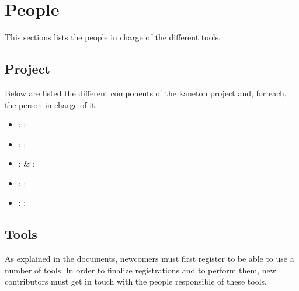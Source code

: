 %
%
%
%
%
%

%
%

\chapter{People}
\label{chapter:people}

This sections lists the people in charge of the different tools.

\newpage

%
%

%
%

\section{Project}

Below are listed the different components of the kaneton project and, for each,
the person in charge of it.

\begin{itemize}
  \item
    : ;
  \item
    : ;
  \item
    :  \& ;
  \item
    : ;
  \item
    : ;
\end{itemize}

%
%

\section{Tools}

As explained in the documents, newcomers must first register to be able to
use a number of tools. In order to finalize registrations and to perform them,
new contributors must get in touch with the people responsible of these
tools.

